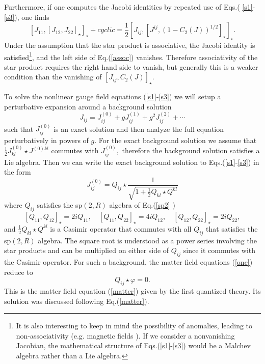 \documentclass[a4paper,12pt]{article}
\begin{document}
Furthermore, if one computes the Jacobi identities by repeated use of Eqs.(%
\ref{s1}-\ref{s3}), one finds 
\begin{equation}
\left[ J_{11},\left[ J_{12},J_{22}\right] _{\star }\right] _{\star }+cyclic=%
\frac{1}{2}\left[ J_{ij},\left[ J^{ij},\left( 1-C_{2}\left( J\right) \right)
^{1/2}\right] _{\star }\right] _{\star }.  \label{assoc}
\end{equation}
Under the assumption that the star product is associative, the Jacobi
identity is satisfied\footnote{%
It is also interesting to keep in mind the possibility of anomalies, leading
to non-associativity (e.g. magnetic fields \cite{zumino}). If we consider a
nonvanishing Jacobian, the mathematical structure of Eqs.(\ref{s1}-\ref{s3})
would be a Malchev algebra rather than a Lie algebra.}, and the left side of
Eq.(\ref{assoc}) vanishes. Therefore associativity of the star product
requires the right hand side to vanish, but generally this is a weaker
condition than the vanishing of $\left[ J_{ij},C_{2}\left( J\right) \right]
_{\star }.$

To solve the nonlinear gauge field equations (\ref{s1}-\ref{s3}) we will
setup a perturbative expansion around a background solution 
\begin{equation}
J_{ij}=J_{ij}^{\left( 0\right) }+gJ_{ij}^{\left( 1\right)
}+g^{2}J_{ij}^{\left( 2\right) }+\cdots
\end{equation}
such that $J_{ij}^{\left( 0\right) }$ is an exact solution and then analyze
the full equation perturbatively in powers of $g.$ For the exact background
solution we assume that $\frac{1}{2}J_{kl}^{\left( 0\right) }\star J^{(0)kl}$
commutes with $J_{ij}^{\left( 0\right) },$ therefore the background solution
satisfies a Lie algebra. Then we can write the exact background solution to
Eqs.(\ref{s1}-\ref{s3}) in the form 
\begin{equation}
J_{ij}^{\left( 0\right) }=Q_{ij}\star \frac{1}{\sqrt{1+\frac{1}{2}%
Q_{kl}\star Q^{kl}}}  \label{JQ}
\end{equation}
where $Q_{ij}$ satisfies the sp$\left( 2,R\right) $ algebra of Eq.(\ref{sp2}%
) 
\begin{equation}
\left[ Q_{11},Q_{12}\right] _{\star }=2iQ_{11},\quad \left[ Q_{11},Q_{22}%
\right] _{\star }=4iQ_{12},\quad \left[ Q_{12},Q_{22}\right] _{\star
}=2iQ_{22},  \label{Qalg}
\end{equation}
and $\frac{1}{2}Q_{kl}\star Q^{kl}$ is a Casimir operator that commutes with
all $Q_{ij}$ that satisfies the sp$\left( 2,R\right) $ algebra. The square
root is understood as a power series involving the star products and can be
multiplied on either side of $Q_{ij}$ since it commutes with the Casimir
operator. For such a background, the matter field equations (\ref{one})
reduce to 
\begin{equation}
Q_{ij}\star \varphi =0.  \label{Qphi}
\end{equation}
This is the matter field equation (\ref{matter}) given by the first
quantized theory. Its solution was discussed following Eq.(\ref{matter}).
\end{document}
